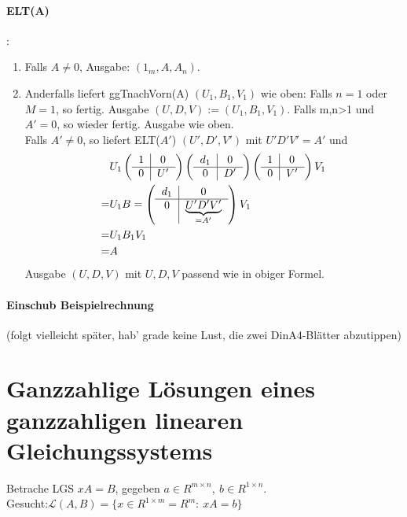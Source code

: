 \documentclass[a4paper,twoside,DIV15,BCOR12mm]{scrbook}
\begin{document}
\paragraph{ELT(A)}:
\begin{enumerate}
    \item Falls $A\neq0$, Ausgabe: $(1_m,A,A_n)$.
    \item Anderfalls liefert ggTnachVorn(A) $(U_1,B_1,V_1)$ wie
    oben: Falls $n=1$ oder $M=1$, so fertig. Ausgabe
    $(U,D,V):=(U_1,B_1,V_1)$. Falls m,n>1 und $A'=0$, so wieder
    fertig. Ausgabe wie oben.\\
    Falls $A'\neq 0$, so liefert ELT($A'$) $(U',D',V')$ mit
    $U'D'V'=A'$ und
    \begin{align*}
        & U_1 \left(\begin{tabular}{c|c} $1$& 0\\\hline 0 & $U'$
    \end{tabular}\right) \left(\begin{tabular}{c|c} $d_1$& 0\\\hline 0 & $D'$
    \end{tabular}\right) \left(\begin{tabular}{c|c} $1$& 0\\\hline 0 & $V'$
    \end{tabular}\right) V_1\\
    =&U_1 B=\left(\begin{tabular}{c|c} $d_1$& 0\\\hline 0 & $\underbrace{U'D'V'}_{=A'}$
    \end{tabular}\right) V_1\\
    =&U_1B_1V_1\\
    =&A
    \end{align*}
    Ausgabe $(U,D,V)$ mit $U,D,V$ passend wie in obiger Formel.
\end{enumerate}
\paragraph{Einschub Beispielrechnung} (folgt vielleicht später, hab'
grade keine Lust, die zwei DinA4-Blätter abzutippen)

\section{Ganzzahlige Lösungen eines ganzzahligen linearen
Gleichungssystems} Betrache LGS $xA=B$, gegeben $a\in R^{m\times
n},\ b\in R^{1\times n}$.\\
Gesucht:$\mathcal{L}(A,B)=\{  x\in R^{1\times m}=R^m:\ xA=b  \}$
\end{document}
